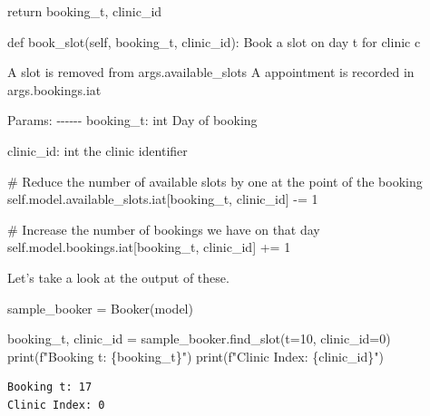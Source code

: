 \documentclass[
  letterpaper,
  DIV=11,
  numbers=noendperiod]{scrreprt}
\newenvironment{Shaded}{}{}
\newcommand{\BuiltInTok}[1]{\textcolor[rgb]{0.84,0.23,0.29}{#1}}
\newcommand{\CommentTok}[1]{\textcolor[rgb]{0.42,0.45,0.49}{#1}}
\newcommand{\ControlFlowTok}[1]{\textcolor[rgb]{0.84,0.23,0.29}{#1}}
\newcommand{\DecValTok}[1]{\textcolor[rgb]{0.00,0.36,0.77}{#1}}
\newcommand{\KeywordTok}[1]{\textcolor[rgb]{0.84,0.23,0.29}{#1}}
\newcommand{\NormalTok}[1]{\textcolor[rgb]{0.14,0.16,0.18}{#1}}
\newcommand{\OperatorTok}[1]{\textcolor[rgb]{0.14,0.16,0.18}{#1}}
\newcommand{\SpecialCharTok}[1]{\textcolor[rgb]{0.00,0.36,0.77}{#1}}
\newcommand{\SpecialStringTok}[1]{\textcolor[rgb]{0.01,0.18,0.38}{#1}}
\newcommand{\VariableTok}[1]{\textcolor[rgb]{0.89,0.38,0.04}{#1}}
\begin{document}
\begin{Shaded}
\begin{Highlighting}[]
        \ControlFlowTok{return}\NormalTok{ booking\_t, clinic\_id}


    \KeywordTok{def}\NormalTok{ book\_slot(}\VariableTok{self}\NormalTok{, booking\_t, clinic\_id):}
        \CommentTok{\textquotesingle{}\textquotesingle{}\textquotesingle{}}
\CommentTok{        Book a slot on day t for clinic c}

\CommentTok{        A slot is removed from args.available\_slots}
\CommentTok{        A appointment is recorded in args.bookings.iat}

\CommentTok{        Params:}
\CommentTok{        {-}{-}{-}{-}{-}{-}}
\CommentTok{        booking\_t: int}
\CommentTok{            Day of booking}

\CommentTok{        clinic\_id: int}
\CommentTok{            the clinic identifier}
\CommentTok{        \textquotesingle{}\textquotesingle{}\textquotesingle{}}

        \CommentTok{\# Reduce the number of available slots by one at the point of the booking}
        \VariableTok{self}\NormalTok{.model.available\_slots.iat[booking\_t, clinic\_id] }\OperatorTok{{-}=} \DecValTok{1}

        \CommentTok{\# Increase the number of bookings we have on that day}
        \VariableTok{self}\NormalTok{.model.bookings.iat[booking\_t, clinic\_id] }\OperatorTok{+=} \DecValTok{1}
\end{Highlighting}
\end{Shaded}

Let's take a look at the output of these.

\begin{Shaded}
\begin{Highlighting}[]
\NormalTok{sample\_booker }\OperatorTok{=}\NormalTok{ Booker(model)}

\NormalTok{booking\_t, clinic\_id }\OperatorTok{=}\NormalTok{ sample\_booker.find\_slot(t}\OperatorTok{=}\DecValTok{10}\NormalTok{, clinic\_id}\OperatorTok{=}\DecValTok{0}\NormalTok{)}
\BuiltInTok{print}\NormalTok{(}\SpecialStringTok{f"Booking t: }\SpecialCharTok{\{}\NormalTok{booking\_t}\SpecialCharTok{\}}\SpecialStringTok{"}\NormalTok{)}
\BuiltInTok{print}\NormalTok{(}\SpecialStringTok{f"Clinic Index: }\SpecialCharTok{\{}\NormalTok{clinic\_id}\SpecialCharTok{\}}\SpecialStringTok{"}\NormalTok{)}
\end{Highlighting}
\end{Shaded}

\begin{verbatim}
Booking t: 17
Clinic Index: 0
\end{verbatim}
\end{document}
